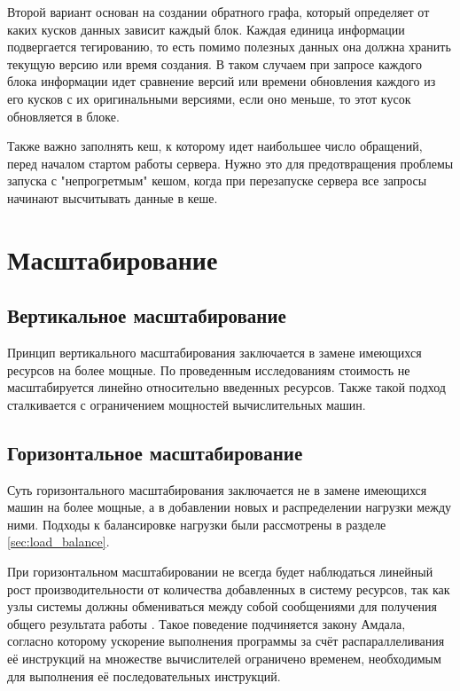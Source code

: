 Второй вариант основан на создании обратного графа, который определяет от каких кусков данных зависит каждый блок. Каждая единица информации подвергается тегированию, то есть помимо полезных данных она должна хранить текущую версию или время создания. В таком случаем при запросе каждого блока информации идет сравнение версий или времени обновления каждого из его кусков с их оригинальными версиями, если оно меньше, то этот кусок обновляется в блоке.

Также важно заполнять кеш, к которому идет наибольшее число обращений, перед началом стартом работы сервера. Нужно это для предотвращения проблемы запуска с "непрогретмым" кешом, когда при перезапуске сервера все запросы начинают высчитывать данные в кеше.

\section{Масштабирование}

\subsection{Вертикальное масштабирование}

Принцип вертикального масштабирования заключается в замене имеющихся ресурсов на более мощные. По проведенным исследованиям \cite{henderson} стоимость не масштабируется линейно относительно введенных ресурсов. Также такой подход сталкивается с ограничением мощностей вычислительных машин.

\subsection{Горизонтальное масштабирование}

Суть горизонтального масштабирования заключается не в замене имеющихся машин на более мощные, а в добавлении новых и распределении нагрузки между ними. Подходы к балансировке нагрузки были рассмотрены в разделе \ref{sec:load_balance}.

При горизонтальном масштабировании не всегда будет наблюдаться линейный рост производительности от количества добавленных в систему ресурсов, так как узлы системы должны обмениваться между собой сообщениями для получения общего результата работы \cite{henderson}. Такое поведение подчиняется закону Амдала, согласно которому ускорение выполнения программы за счёт распараллеливания её инструкций на множестве вычислителей ограничено временем, необходимым для выполнения её последовательных инструкций.

